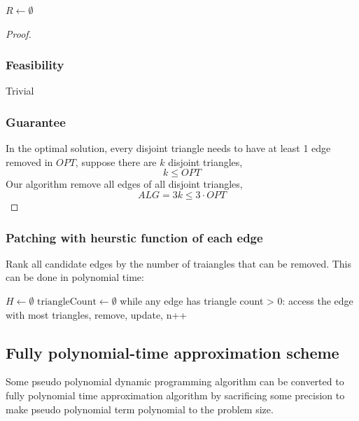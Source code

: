 \documentclass[10pt]{article}
\theoremstyle{definition}
\begin{document}
\begin{algorithm}[H]

$R \gets \emptyset$\;


\;
\end{algorithm}
\begin{proof}
  \subsubsection*{Feasibility}
  Trivial
  \subsubsection*{Guarantee}
  In the optimal solution, every disjoint triangle needs to have at least 1 edge removed in $OPT$, suppose there
  are $k$ disjoint triangles, 
  \[k \leq OPT\]
  Our algorithm remove all edges of all disjoint triangles, 
  \[ALG = 3k \leq 3\cdot OPT\]
\end{proof}
\subsubsection*{Patching with heurstic function of each edge}
Rank all candidate edges by the number of traiangles that can be removed. This can be done in 
polynomial time: 
\begin{algorithm}[H]
$H \gets \emptyset$\;
$\text{triangleCount} \gets \emptyset$\; %
while any edge has triangle count > 0:
  access the edge with most triangles, 
  remove, 
  update, 
  n++
  
\end{algorithm}


\subsection{Fully polynomial-time approximation scheme}
Some pseudo polynomial dynamic programming algorithm can be converted to fully polynomial time approximation algorithm
by sacrificing some precision to make pseudo polynomial term polynomial to the problem size. 
\end{document}
